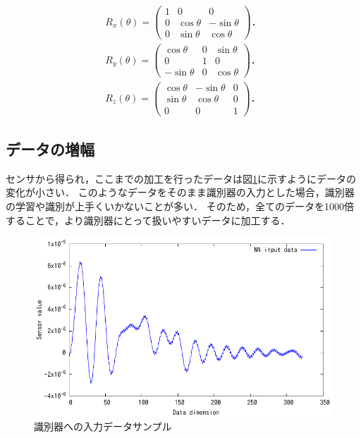 \begin{eqnarray}
\label{rotate-matrix}
R_x(\theta) = \left(
    \begin{array}{ccc}
        1 & 0 & 0 \\
        0 & \cos\theta & -\sin\theta \\
        0 & \sin\theta & \cos\theta
    \end{array}
\right)． \nonumber \\
R_y(\theta) = \left(
    \begin{array}{ccc}
        \cos\theta & 0 & \sin\theta \\
        0 & 1 & 0 \\
        -\sin\theta & 0 & \cos\theta
    \end{array}
\right)． \nonumber \\
R_z(\theta) = \left(
    \begin{array}{ccc}
        \cos\theta & -\sin\theta & 0 \\
        \sin\theta & \cos\theta & 0 \\
        0 & 0 & 1
    \end{array}
\right)．
\end{eqnarray}

\subsection{データの増幅}
センサから得られ，ここまでの加工を行ったデータは図\ref{data-sample}に示すようにデータの変化が小さい．
このようなデータをそのまま識別器の入力とした場合，識別器の学習や識別が上手くいかないことが多い．
そのため，全てのデータを1000倍することで，より識別器にとって扱いやすいデータに加工する．

\begin{figure}[bthp]
  \centering
  \includegraphics[bb=0 0 360 216, width=12cm]{Graphs/data.pdf}
  \caption{識別器への入力データサンプル}
  \label{data-sample}
\end{figure}

